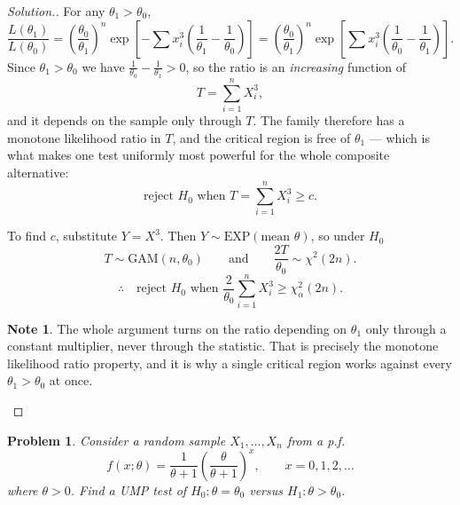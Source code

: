 \documentclass[12pt,a4paper]{report}
\theoremstyle{definition}
\newtheorem{note}[thm]{Note}
\theoremstyle{plain}
\newtheorem{problemx}{Problem}[section]
\newenvironment{problem}{\begin{problemx}}{\end{problemx}}
\newenvironment{solution}
  {\renewcommand{\qedsymbol}{}\begin{proof}[\textit{Solution}.]}
  {\end{proof}}
\begin{document}
\begin{solution}
For any $\theta_1>\theta_0$,
\[\frac{L(\theta_1)}{L(\theta_0)}
=\left(\frac{\theta_0}{\theta_1}\right)^n
\exp\!\left[-\sum x_i^3\left(\frac{1}{\theta_1}-\frac{1}{\theta_0}\right)\right]
=\left(\frac{\theta_0}{\theta_1}\right)^n
\exp\!\left[\sum x_i^3\left(\frac{1}{\theta_0}-\frac{1}{\theta_1}\right)\right].\]
Since $\theta_1>\theta_0$ we have $\frac{1}{\theta_0}-\frac{1}{\theta_1}>0$, so the
ratio is an \emph{increasing} function of
\[T=\sum_{i=1}^nX_i^3,\]
and it depends on the sample only through $T$. The family therefore has a monotone
likelihood ratio in $T$, and the critical region is free of $\theta_1$ --- which is
what makes one test uniformly most powerful for the whole composite alternative:
\[\text{reject } H_0 \text{ when } T=\sum_{i=1}^nX_i^3\geq c.\]

To find $c$, substitute $Y=X^3$. Then $Y\sim\text{EXP}(\text{mean }\theta)$, so
under $H_0$
\[T\sim\text{GAM}(n,\theta_0)\qquad\text{and}\qquad
\frac{2T}{\theta_0}\sim\chi^2(2n).\]
\[\therefore\quad\text{reject } H_0 \text{ when }
\frac{2}{\theta_0}\sum_{i=1}^nX_i^3\geq\chi^2_{\alpha}(2n).\]

\begin{note}
The whole argument turns on the ratio depending on $\theta_1$ only through a
constant multiplier, never through the statistic. That is precisely the monotone
likelihood ratio property, and it is why a single critical region works against
every $\theta_1>\theta_0$ at once.
\end{note}
\end{solution}

\begin{problem}
Consider a random sample $X_1,\ldots,X_n$ from a p.f.
\[f(x;\theta)=\frac{1}{\theta+1}\left(\frac{\theta}{\theta+1}\right)^x,
\qquad x=0,1,2,\ldots\]
where $\theta>0$. Find a UMP test of $H_0:\theta=\theta_0$ versus
$H_1:\theta>\theta_0$.
\end{problem}
\end{document}
